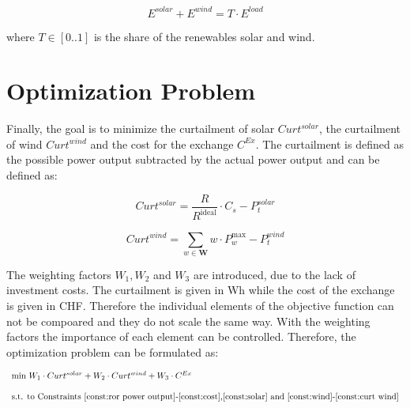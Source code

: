 \begin{equation}\label{const:renewable}
    E^{solar} + E^{wind} = T \cdot E^{load}
\end{equation}

\noindent where $T \in [0..1]$ is the share of the renewables solar and wind. 

\section{Optimization Problem}
Finally, the goal is to minimize the curtailment of solar $Curt^{solar}$, the curtailment of wind $Curt^{wind}$ and the cost for the exchange $C^{Ex}$. The curtailment is defined as the possible power output subtracted by the actual power output and can be defined as: 

\begin{equation}\label{const:curt solar}
    Curt^{solar} = \frac{R}{R^\text{ideal}} \cdot C_s - P^{solar}_{t}
\end{equation}

\begin{equation}\label{const:curt wind}
    Curt^{wind} = \sum_{w \in \textbf{W}} w \cdot P^\text{max}_w -  P^{wind}_{t}
\end{equation}

The weighting factors $W_1, W_2$ and $W_3$ are introduced, due to the lack of investment costs. The curtailment is given in Wh while the cost of the exchange is given in CHF. Therefore the individual elements of the objective function can not be compoared and they do not scale the same way. With the weighting factors the importance of each element can be controlled. 
Therefore, the optimization problem can be formulated as: 

\begin{equation}\label{objective function}
 \begin{array}{l}
    \text{min} \,\, W_1 \cdot Curt^{solar} + W_2 \cdot Curt^{wind} + W_3 \cdot C^{Ex} \\ \\
    \text{s.t. to Constraints \eqref{const:ror power output}-\eqref{const:cost},\eqref{const:solar} and \eqref{const:wind}-\eqref{const:curt wind}}
 \end{array}
\end{equation}